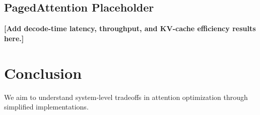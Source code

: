 \documentclass{article}
\begin{document}
\subsection{PagedAttention Placeholder}

\textbf{[Add decode-time latency, throughput, and KV-cache efficiency results here.]}

\section{Conclusion}

We aim to understand system-level tradeoffs in attention optimization through simplified implementations.




\cite{kwon2023pagedattention}
\cite{dao2023flashattention2}
\end{document}
